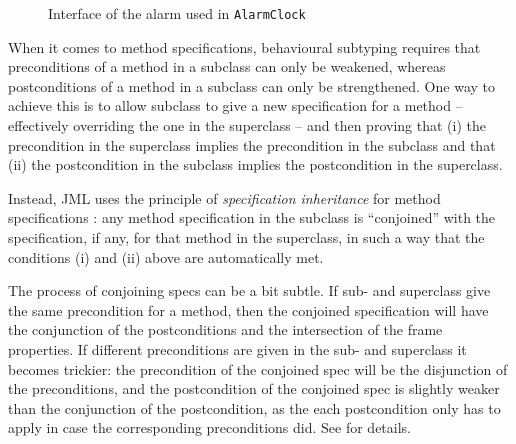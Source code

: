 \documentclass{llncs}
\begin{document}
\begin{figure}[tbp] \label{Example:alarminterface}
%

%
\vspace*{-2ex} %
\caption{Interface of the alarm used in \texttt{AlarmClock}}
\end{figure}

When it comes to method specifications, behavioural subtyping requires
that preconditions of a method in a subclass can only  be weakened,
whereas postconditions of a method in a subclass can only  be strengthened.
One way to achieve this is to allow subclass to give a new specification
for a method -- effectively overriding the one in the superclass --
and then proving that (i) the precondition in the superclass implies the
precondition in the subclass and that (ii) the postcondition in the subclass
implies the postcondition in the superclass.

Instead, JML uses the principle of \emph{specification inheritance} 
for method specifications \cite{Dhara-Leavens96}: any method specification
in the subclass is ``conjoined'' with the specification, if any, for that
method in the superclass, in such a way that the conditions (i) and (ii) above 
are automatically met.

The process of conjoining specs can be a bit subtle.  If sub- and superclass
give the same precondition for a method, then the conjoined specification will
have the conjunction of the postconditions and the intersection of the frame
properties.  If different preconditions are given in the sub- and superclass it
becomes trickier: the precondition of the conjoined spec will be the
disjunction of the preconditions, and the postcondition of the conjoined spec
is slightly weaker than the conjunction of the postcondition, as the each
postcondition only has to apply in case the corresponding preconditions did.
See \cite{Dhara-Leavens96} for details.


% 
\end{document}

